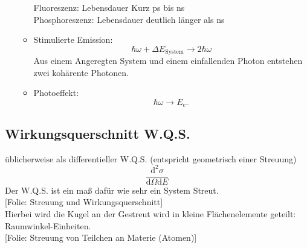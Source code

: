 \documentclass[titlepage,11pt,a4paper,ngerman]{report}
\newcommand{\tx}[1]{\textrm{#1}}
\newcommand{\dd}{\tx{d}}
\newcommand{\folie}[1]{\color{gray}[Folie: #1]\color{black}}
\newcommand{\lcom}[1]{\color{MidnightBlue}#1\color{black}}
\begin{document}
\begin{enumerate}[A)]
\begin{itemize}
\begin{equation*}
		\end{equation*}
		Fluoreszenz: Lebensdauer Kurz ps bis ns \\
		Phosphoreszenz: Lebensdauer deutlich länger als ns \\
		\item Stimulierte Emission:
		\begin{equation*}
		\hbar \omega + \Delta E_{\tx{System}} \rightarrow 2 \hbar \omega
		\end{equation*}
		\lcom{Aus einem Angeregten System und einem einfallenden Photon entstehen zwei kohärente Photonen.}
		\item Photoeffekt:
		\begin{equation*}
		\hbar \omega \rightarrow E_{e^-}
		\end{equation*}
	\end{itemize}
\end{enumerate}

\subsection{Wirkungsquerschnitt W.Q.S.}

üblicherweise als differentieller W.Q.S. (entspricht geometrisch einer Streuung)
\begin{equation*}
\frac{\dd^2 \sigma}{\dd \Omega \dd E}
\end{equation*}
\lcom{Der W.Q.S. ist ein maß dafür wie sehr ein System Streut.}\\
\folie{Streuung und Wirkungsquerschnitt}\\
\lcom{Hierbei wird die Kugel an der Gestreut wird in kleine Flächenelemente geteilt: Raumwinkel-Einheiten.}\\
\folie{Streuung von Teilchen an Materie (Atomen)}
\end{document}
